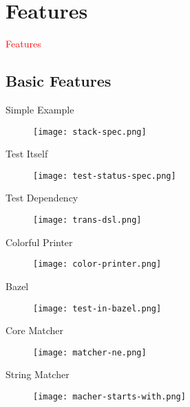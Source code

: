 \section{Features}
\label{sec:features}

\begin{frame}
  \begin{center}
    \Huge{\textcolor{red}{Features}}
  \end{center}
\end{frame}

\subsection{Basic Features}

\begin{frame}{Simple Example}
    \centering
    \begin{figure}
      \centering
      \texttt{[image: stack-spec.png]}
    \end{figure}
\end{frame}

\begin{frame}{Test Itself}
    \centering
    \begin{figure}
      \centering
      \texttt{[image: test-status-spec.png]}
    \end{figure}
\end{frame}

\begin{frame}{Test Dependency}
    \centering
    \begin{figure}
      \centering
      \texttt{[image: trans-dsl.png]}
    \end{figure}
\end{frame}

\begin{frame}{Colorful Printer}
    \centering
    \begin{figure}
      \centering
      \texttt{[image: color-printer.png]}
    \end{figure}
\end{frame}

\begin{frame}{Bazel}
    \centering
    \begin{figure}
      \centering
      \texttt{[image: test-in-bazel.png]}
    \end{figure}
\end{frame}

\begin{frame}{Core Matcher}
    \centering
    \begin{figure}
      \centering
      \texttt{[image: matcher-ne.png]}
    \end{figure}
\end{frame}

\begin{frame}{String Matcher}
    \centering
    \begin{figure}
      \centering
      \texttt{[image: macher-starts-with.png]}
    \end{figure}
\end{frame}

